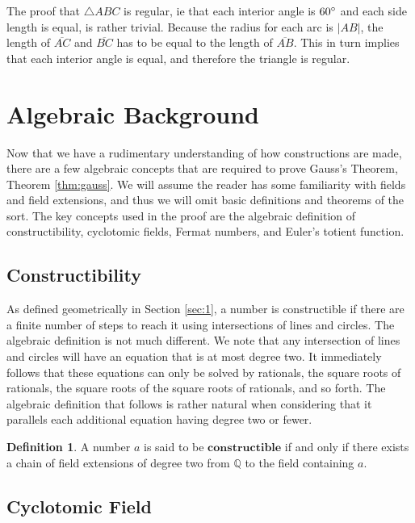 \documentclass[reqno]{amsart}
\theoremstyle{definition}
\newtheorem{definition}[theorem]{Definition}
\numberwithin{equation}{section}
\newcommand{\bQ}{\mathbb{Q}}
\begin{document}
The proof that $\triangle ABC$ is regular, ie that each interior angle is $60\degree$ and each side length is equal, is rather trivial. Because the radius for each arc is $|AB|$, the length of $\overline{AC}$ and $\overline{BC}$ has to be equal to the length of $\overline{AB}$. This in turn implies that each interior angle is equal, and therefore the triangle is regular.

\section{Algebraic Background}\label{sec:3}

Now that we have a rudimentary understanding of how constructions are made, there are a few algebraic concepts that are required to prove Gauss's Theorem, Theorem \ref{thm:gauss}. We will assume the reader has some familiarity with fields and field extensions, and thus we will omit basic definitions and theorems of the sort. The key concepts used in the proof are the algebraic definition of constructibility, cyclotomic fields, Fermat numbers, and Euler's totient function.

\subsection{Constructibility}\label{subsec:const}

As defined geometrically in Section \ref{sec:1}, a number is constructible if there are a finite number of steps to reach it using intersections of lines and circles. The algebraic definition is not much different. We note that any intersection of lines and circles will have an equation that is at most degree two. It immediately follows that these equations can only be solved by rationals, the square roots of rationals, the square roots of the square roots of rationals, and so forth. The algebraic definition that follows is rather natural when considering that it parallels each additional equation having degree two or fewer.
\begin{definition}
A number $a$ is said to be $\mathbf{constructible}$ if and only if there exists a chain of field extensions of degree two from $\bQ$ to the field containing $a$.
\end{definition}

\subsection{Cyclotomic Field}\label{subsec:cf}
\end{document}
